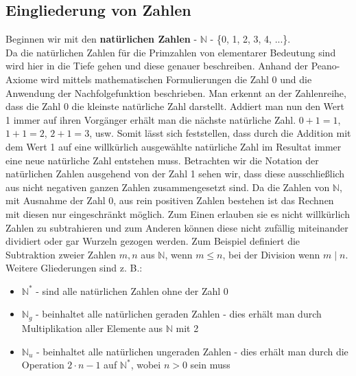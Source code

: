 \documentclass[12pt,a4paper]{article}
\theoremstyle{definition}
\begin{document}
\subsection{Eingliederung von Zahlen}\label{Eingliederung von Zahlen}
Beginnen wir mit den \textbf{natürlichen Zahlen} - $\mathbb{N}$ - \{0, 1, 2, 3, 4, ...\}.\\
Da die natürlichen Zahlen für die Primzahlen von elementarer Bedeutung sind wird hier in die Tiefe gehen und diese genauer beschreiben.
Anhand der Peano-Axiome wird mittels mathematischen Formulierungen die Zahl 0 und die Anwendung der Nachfolgefunktion beschrieben.\newline 
Man erkennt an der Zahlenreihe, dass die Zahl 0 die kleinste natürliche Zahl darstellt.
Addiert man nun den Wert 1 immer auf ihren Vorgänger erhält man die nächste natürliche Zahl.
$0 + 1 = 1$, $1 + 1 = 2$, $2 + 1 = 3$, usw.
Somit lässt sich feststellen, dass durch die Addition mit dem Wert 1 auf eine willkürlich ausgewählte natürliche Zahl im Resultat immer eine neue natürliche Zahl entstehen muss.
Betrachten wir die Notation der natürlichen Zahlen ausgehend von der Zahl 1 sehen wir, dass diese ausschließlich aus nicht negativen ganzen Zahlen zusammengesetzt sind.\newline
Da die Zahlen von $\mathbb{N}$, mit Ausnahme der Zahl 0, aus rein positiven Zahlen bestehen ist das Rechnen mit diesen nur eingeschränkt möglich.
Zum Einen erlauben sie es nicht willkürlich Zahlen zu subtrahieren und zum Anderen können diese nicht zufällig miteinander dividiert oder gar Wurzeln gezogen werden.
Zum Beispiel definiert die Subtraktion zweier Zahlen $m, n$ aus $\mathbb{N}$, wenn $m \le n$, bei der Division wenn $m \mid n$.\newline
Weitere Gliederungen sind z. B.:
\begin{itemize}
\item $\mathbb{N}^*$ - sind alle natürlichen Zahlen ohne der Zahl 0
\item $\mathbb{N}_g$ - beinhaltet alle natürlichen geraden Zahlen - dies erhält man durch Multiplikation aller Elemente aus $\mathbb{N}$ mit 2
\item $\mathbb{N}_u$ - beinhaltet alle natürlichen ungeraden Zahlen - dies erhält man durch die Operation $2 \cdot n - 1$ auf $\mathbb{N}^*$, wobei $n > 0$ sein muss
\end{itemize}
\end{document}
